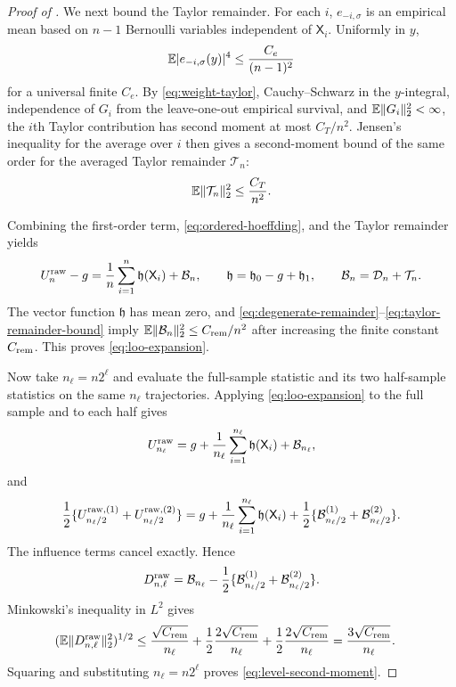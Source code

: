 \begin{proof}[Proof of ]
We next bound the Taylor remainder.  For each $i$, $e_{-i,\sigma}$ is an empirical mean based on $n-1$ Bernoulli variables independent of $\mathsf X_i$.  Uniformly in $y$,
\begin{equation}\label{eq:bernoulli-fourth-moment}
 \mathbb E\lvert e_{-i,\sigma}(y)\rvert^4\le\frac{C_e}{(n-1)^2}
\end{equation}
for a universal finite $C_e$.  By \eqref{eq:weight-taylor}, Cauchy--Schwarz in the $y$-integral, independence of $G_i$ from the leave-one-out empirical survival, and $\mathbb E\lVert G_i\rVert_2^2<\infty$, the $i$th Taylor contribution has second moment at most $C_T/n^2$.  Jensen's inequality for the average over $i$ then gives a second-moment bound of the same order for the averaged Taylor remainder $\mathcal T_n$:
\begin{equation}\label{eq:taylor-remainder-bound}
 \mathbb E\lVert\mathcal T_n\rVert_2^2\le\frac{C_T}{n^2}.
\end{equation}

Combining the first-order term, \eqref{eq:ordered-hoeffding}, and the Taylor remainder yields
\[
 U_n^{\rm raw}-g
 =\frac1n\sum_{i=1}^{n}\mathfrak h(\mathsf X_i)+\mathcal B_n,
 \qquad
 \mathfrak h=\mathfrak h_0-g+\mathfrak h_1,
 \qquad
 \mathcal B_n=\mathcal D_n+\mathcal T_n.
\]
The vector function $\mathfrak h$ has mean zero, and \eqref{eq:degenerate-remainder}--\eqref{eq:taylor-remainder-bound} imply
$\mathbb E\lVert\mathcal B_n\rVert_2^2\le C_{\rm rem}/n^2$ after increasing the finite constant $C_{\rm rem}$.  This proves \eqref{eq:loo-expansion}.

Now take $n_\ell=n2^\ell$ and evaluate the full-sample statistic and its two half-sample statistics on the same $n_\ell$ trajectories.  Applying \eqref{eq:loo-expansion} to the full sample and to each half gives
\[
 U_{n_\ell}^{\rm raw}
 =g+\frac1{n_\ell}\sum_{i=1}^{n_\ell}\mathfrak h(\mathsf X_i)+\mathcal B_{n_\ell},
\]
and
\[
 \frac12\{U_{n_\ell/2}^{\rm raw,(1)}+U_{n_\ell/2}^{\rm raw,(2)}\}
 =g+\frac1{n_\ell}\sum_{i=1}^{n_\ell}\mathfrak h(\mathsf X_i)
 +\frac12\{\mathcal B_{n_\ell/2}^{(1)}+\mathcal B_{n_\ell/2}^{(2)}\}.
\]
The influence terms cancel exactly.  Hence
\[
 D_{n,\ell}^{\rm raw}
 =\mathcal B_{n_\ell}-\frac12\{\mathcal B_{n_\ell/2}^{(1)}+\mathcal B_{n_\ell/2}^{(2)}\}.
\]
Minkowski's inequality in $L^2$ gives
\begin{align*}
 (\mathbb E\lVert D_{n,\ell}^{\rm raw}\rVert_2^2)^{1/2}
 &\le\frac{\sqrt{C_{\rm rem}}}{n_\ell}
 +\frac12\frac{2\sqrt{C_{\rm rem}}}{n_\ell}
 +\frac12\frac{2\sqrt{C_{\rm rem}}}{n_\ell}
 =\frac{3\sqrt{C_{\rm rem}}}{n_\ell}.
\end{align*}
Squaring and substituting $n_\ell=n2^\ell$ proves \eqref{eq:level-second-moment}.


\end{proof}
